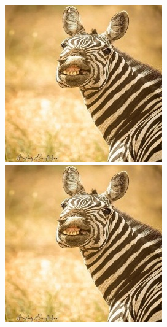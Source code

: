 \documentclass[12pt, fleqn, titlepage]{article}
\newcommand\skipper{1.4pt}
\begin{document}
\begin{figure}[H]
\begin{subfigure}[b]{0.8\textwidth}
		\hskip\skipper
		\includegraphics[width=0.18\linewidth]{imgs/temp_zebra}
		\hskip\skipper
		\includegraphics[width=0.18\linewidth]{imgs/temp_zebra}
	\end{subfigure}
\end{figure}
\end{document}
